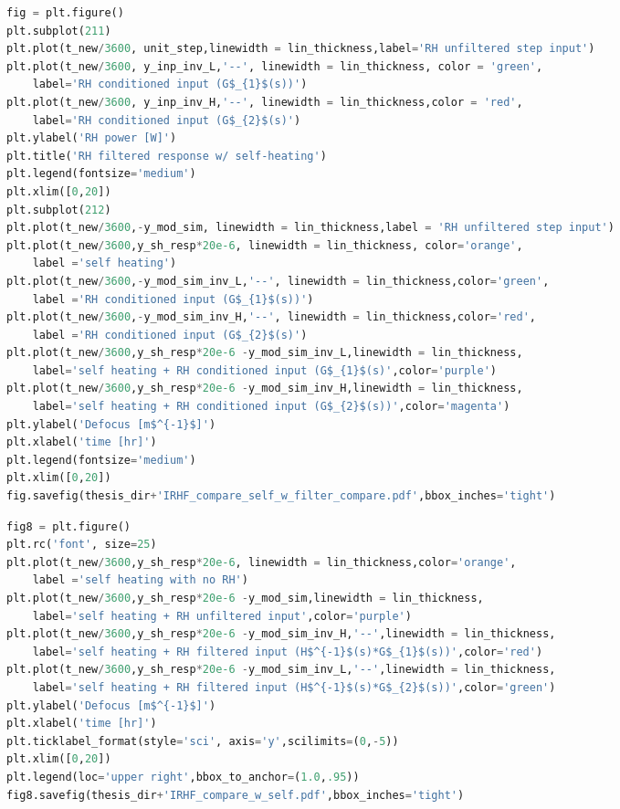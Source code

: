 \begin{spacing}{1.2} \begin{lstlisting}[frame=single,language=Python]
fig = plt.figure()
plt.subplot(211)
plt.plot(t_new/3600, unit_step,linewidth = lin_thickness,label='RH unfiltered step input')
plt.plot(t_new/3600, y_inp_inv_L,'--', linewidth = lin_thickness, color = 'green',
    label='RH conditioned input (G$_{1}$(s))')
plt.plot(t_new/3600, y_inp_inv_H,'--', linewidth = lin_thickness,color = 'red', 
    label='RH conditioned input (G$_{2}$(s)')
plt.ylabel('RH power [W]')
plt.title('RH filtered response w/ self-heating')
plt.legend(fontsize='medium')
plt.xlim([0,20])
plt.subplot(212)
plt.plot(t_new/3600,-y_mod_sim, linewidth = lin_thickness,label = 'RH unfiltered step input')
plt.plot(t_new/3600,y_sh_resp*20e-6, linewidth = lin_thickness, color='orange',
    label ='self heating')
plt.plot(t_new/3600,-y_mod_sim_inv_L,'--', linewidth = lin_thickness,color='green',
    label ='RH conditioned input (G$_{1}$(s))')
plt.plot(t_new/3600,-y_mod_sim_inv_H,'--', linewidth = lin_thickness,color='red',
    label ='RH conditioned input (G$_{2}$(s)')
plt.plot(t_new/3600,y_sh_resp*20e-6 -y_mod_sim_inv_L,linewidth = lin_thickness, 
    label='self heating + RH conditioned input (G$_{1}$(s)',color='purple')
plt.plot(t_new/3600,y_sh_resp*20e-6 -y_mod_sim_inv_H,linewidth = lin_thickness,
    label='self heating + RH conditioned input (G$_{2}$(s))',color='magenta')
plt.ylabel('Defocus [m$^{-1}$]')
plt.xlabel('time [hr]')
plt.legend(fontsize='medium')
plt.xlim([0,20])
fig.savefig(thesis_dir+'IRHF_compare_self_w_filter_compare.pdf',bbox_inches='tight')
\end{lstlisting} \end{spacing}


\begin{spacing}{1.2} \begin{lstlisting}[frame=single,language=Python]
fig8 = plt.figure()
plt.rc('font', size=25)
plt.plot(t_new/3600,y_sh_resp*20e-6, linewidth = lin_thickness,color='orange',
    label ='self heating with no RH')
plt.plot(t_new/3600,y_sh_resp*20e-6 -y_mod_sim,linewidth = lin_thickness,
    label='self heating + RH unfiltered input',color='purple')
plt.plot(t_new/3600,y_sh_resp*20e-6 -y_mod_sim_inv_H,'--',linewidth = lin_thickness,
    label='self heating + RH filtered input (H$^{-1}$(s)*G$_{1}$(s))',color='red')
plt.plot(t_new/3600,y_sh_resp*20e-6 -y_mod_sim_inv_L,'--',linewidth = lin_thickness,
    label='self heating + RH filtered input (H$^{-1}$(s)*G$_{2}$(s))',color='green')
plt.ylabel('Defocus [m$^{-1}$]')
plt.xlabel('time [hr]')
plt.ticklabel_format(style='sci', axis='y',scilimits=(0,-5))
plt.xlim([0,20])
plt.legend(loc='upper right',bbox_to_anchor=(1.0,.95))
fig8.savefig(thesis_dir+'IRHF_compare_w_self.pdf',bbox_inches='tight')
\end{lstlisting} \end{spacing}

